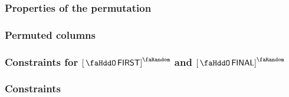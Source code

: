 \subsubsection{Properties of the permutation}                \label{hub: consistencies: storage: permutation}        
\subsubsection{Permuted columns}                             \label{hub: consistencies: storage: columns}            
\subsubsection{Constraints for $\stoFirst$ and $\stoFinal$}  \label{hub: consistencies: storage: permutation}        
\subsubsection{Constraints}                                  \label{hub: consistencies: storage: constraints}        
